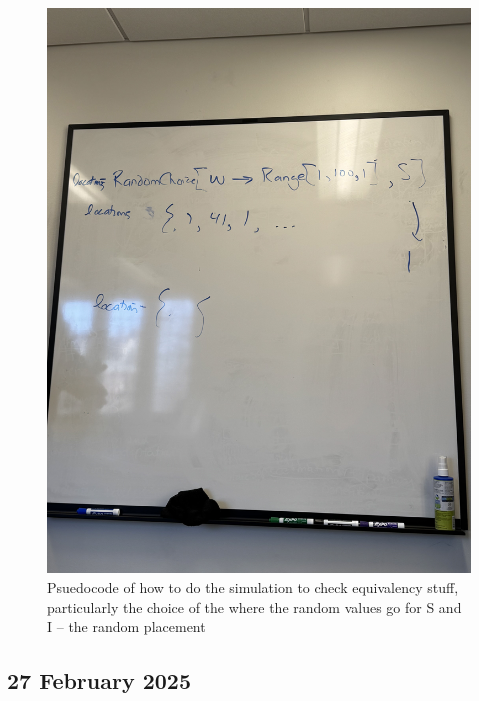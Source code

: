 \documentclass[11pt]{article}
\begin{document}
\begin{figure}[!hpt]
    \centering
    \includegraphics[width=0.65\linewidth]{man/notes-figs/20250130-pseudocode.jpg}
    \caption{Psuedocode of how to do the simulation to check equivalency stuff, particularly the choice of the where the random values go for S and I -- the random placement}
    \label{}
\end{figure}

\subsection{27 February 2025}
\end{document}
